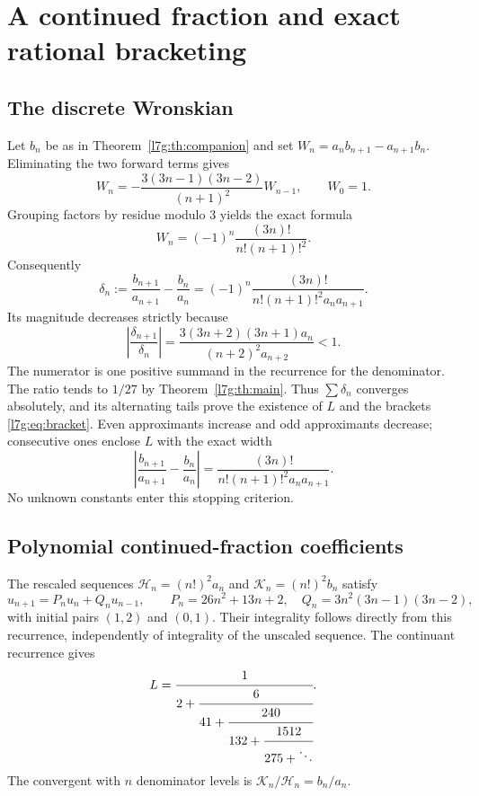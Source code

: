 \documentclass[11pt,letterpaper]{article}
\theoremstyle{remark}\newtheorem{remark}[theorem]{Remark}
\newcounter{l7gtrsavedeq}
\begin{document}
\section{A continued fraction and exact rational bracketing}\label{l7g:sec:continued}
\subsection{The discrete Wronskian}
Let $b_n$ be as in Theorem~\ref{l7g:th:companion} and set
$W_n=a_nb_{n+1}-a_{n+1}b_n$. Eliminating the two forward terms gives
\[
 W_n=-\frac{3(3n-1)(3n-2)}{(n+1)^2}W_{n-1},\qquad W_0=1.
\]
Grouping factors by residue modulo $3$ yields the exact formula
\begin{equation}\label{l7g:eq:Wexact}
 W_n=(-1)^n\frac{(3n)!}{n!(n+1)!^2}.
\end{equation}
Consequently
\begin{equation}\label{l7g:eq:delta}
 \delta_n:=\frac{b_{n+1}}{a_{n+1}}-\frac{b_n}{a_n}
 =(-1)^n\frac{(3n)!}{n!(n+1)!^2a_na_{n+1}}.
\end{equation}
Its magnitude decreases strictly because
\[
 \left|\frac{\delta_{n+1}}{\delta_n}\right|
 =\frac{3(3n+2)(3n+1)a_n}{(n+2)^2a_{n+2}}<1.
\]
The numerator is one positive summand in the recurrence for the
denominator. The ratio tends to $1/27$ by Theorem~\ref{l7g:th:main}.
Thus $\sum\delta_n$ converges absolutely, and its alternating tails
prove the existence of $L$ and the brackets \eqref{l7g:eq:bracket}.
Even approximants increase and odd approximants decrease; consecutive
ones enclose $L$ with the exact width
\begin{equation}\label{l7g:eq:width}
 \left|\frac{b_{n+1}}{a_{n+1}}-\frac{b_n}{a_n}\right|
 =\frac{(3n)!}{n!(n+1)!^2a_na_{n+1}}.
\end{equation}
No unknown constants enter this stopping criterion.

\subsection{Polynomial continued-fraction coefficients}
The rescaled sequences $\mathcal H_n=(n!)^2a_n$ and
$\mathcal K_n=(n!)^2b_n$ satisfy
\begin{equation}\label{l7g:eq:integerrec}
 u_{n+1}=P_nu_n+Q_nu_{n-1},\qquad
 P_n=26n^2+13n+2,\quad Q_n=3n^2(3n-1)(3n-2),
\end{equation}
with initial pairs $(1,2)$ and $(0,1)$. Their integrality follows directly
from this recurrence, independently of integrality of the unscaled
sequence. The continuant recurrence gives
\begin{equation}\label{l7g:eq:CF}
 L=\cfrac1{2+\cfrac6{41+\cfrac{240}{132+\cfrac{1512}{275+\ddots}}}}.
\end{equation}
The convergent with $n$ denominator levels is
$\mathcal K_n/\mathcal H_n=b_n/a_n$.
\end{document}
